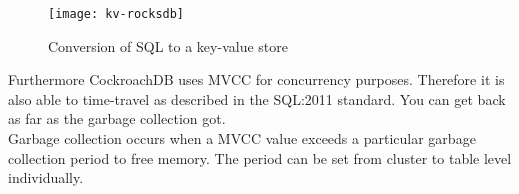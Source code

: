 \begin{figure}[H]
    \texttt{[image: kv-rocksdb]}
    \caption{Conversion of SQL to a key-value store\cite{cockroach-youtube-architecture}}
    \label{fig:kv-rocksdb}
\end{figure}

Furthermore CockroachDB uses MVCC for concurrency purposes. Therefore it is also able to time-travel as described in the SQL:2011 
standard. You can get back as far as the garbage collection got.\\
Garbage collection occurs when a MVCC value exceeds a particular garbage collection period to free memory. The period can be set
from cluster to table level individually.

